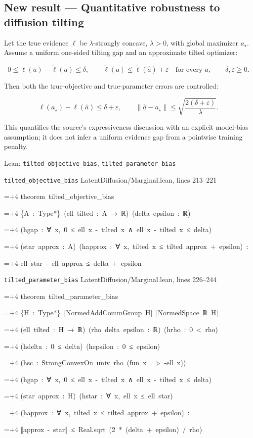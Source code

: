 \documentclass[11pt,a4paper]{report}
\newlength{\leancharwidth}
\newenvironment{leancode}{\par\smallskip\begingroup\ttfamily\footnotesize\raggedright
  \settowidth{\leancharwidth}{M}\setlength{\parskip}{0pt}\setlength{\parindent}{0pt}
  \frenchspacing}{\par\endgroup\smallskip}
\newcommand{\leanline}[2]{\hangindent=\dimexpr#1\leancharwidth+4\leancharwidth\relax
  \hangafter=1\noindent\hspace*{#1\leancharwidth}#2\par}
\newcommand{\leansource}[1]{\par{\footnotesize\color{leanmuted}#1}\par}
\begin{document}
\subsection{\texorpdfstring{New result — Quantitative robustness to diffusion tilting}{New result — Quantitative robustness to diffusion tilting}}



Let the true evidence \(\ell\) be \(\lambda\)-strongly concave, \(\lambda>0\), with global maximizer \(a_\star\). Assume a uniform one-sided tilting gap and an approximate tilted optimizer:



\[0\le\ell(a)-\tilde\ell(a)\le\delta,\qquad\tilde\ell(a)\le\tilde\ell(\hat a)+\varepsilon\quad\text{for every }a,\qquad\delta,\varepsilon\ge0.\]



Then both the true-objective and true-parameter errors are controlled:



\[\ell(a_\star)-\ell(\hat a)\le\delta+\varepsilon,\qquad\|\hat a-a_\star\|\le\sqrt{\frac{2(\delta+\varepsilon)}\lambda}.\]



This quantifies the source's expressiveness discussion with an explicit model-bias assumption; it does not infer a uniform evidence gap from a pointwise training penalty.

\begin{leanbox}{Lean: \texttt{tilted\_\allowbreak{}objective\_\allowbreak{}bias}, \texttt{tilted\_\allowbreak{}parameter\_\allowbreak{}bias}}
\leansource{\texttt{tilted\_\allowbreak{}objective\_\allowbreak{}bias} \quad LatentDiffusion/\allowbreak{}Marginal.lean, lines 213–221}
\begin{leancode}
\leanline{0}{theorem\ tilted\_objective\_bias}
\leanline{4}{\{A\ :\ Type*\}\ (ell\ tilted\ :\ A\ →\ ℝ)\ (delta\ epsilon\ :\ ℝ)}
\leanline{4}{(hgap\ :\ ∀\ x,\ 0\ ≤\ ell\ x\ -\ tilted\ x\ ∧\ ell\ x\ -\ tilted\ x\ ≤\ delta)}
\leanline{4}{(star\ approx\ :\ A)\ (happrox\ :\ ∀\ x,\ tilted\ x\ ≤\ tilted\ approx\ +\ epsilon)\ :}
\leanline{4}{ell\ star\ -\ ell\ approx\ ≤\ delta\ +\ epsilon}
\end{leancode}
\leansource{\texttt{tilted\_\allowbreak{}parameter\_\allowbreak{}bias} \quad LatentDiffusion/\allowbreak{}Marginal.lean, lines 226–244}
\begin{leancode}
\leanline{0}{theorem\ tilted\_parameter\_bias}
\leanline{4}{\{H\ :\ Type*\}\ [NormedAddCommGroup\ H]\ [NormedSpace\ ℝ\ H]}
\leanline{4}{(ell\ tilted\ :\ H\ →\ ℝ)\ (rho\ delta\ epsilon\ :\ ℝ)\ (hrho\ :\ 0\ <\ rho)}
\leanline{4}{(hdelta\ :\ 0\ ≤\ delta)\ (hepsilon\ :\ 0\ ≤\ epsilon)}
\leanline{4}{(hsc\ :\ StrongConvexOn\ univ\ rho\ (fun\ x\ =>\ -ell\ x))}
\leanline{4}{(hgap\ :\ ∀\ x,\ 0\ ≤\ ell\ x\ -\ tilted\ x\ ∧\ ell\ x\ -\ tilted\ x\ ≤\ delta)}
\leanline{4}{(star\ approx\ :\ H)\ (hstar\ :\ ∀\ x,\ ell\ x\ ≤\ ell\ star)}
\leanline{4}{(happrox\ :\ ∀\ x,\ tilted\ x\ ≤\ tilted\ approx\ +\ epsilon)\ :}
\leanline{4}{‖approx\ -\ star‖\ ≤\ Real.sqrt\ (2\ *\ (delta\ +\ epsilon)\ /\ rho)}
\end{leancode}
\end{leanbox}
\end{document}
